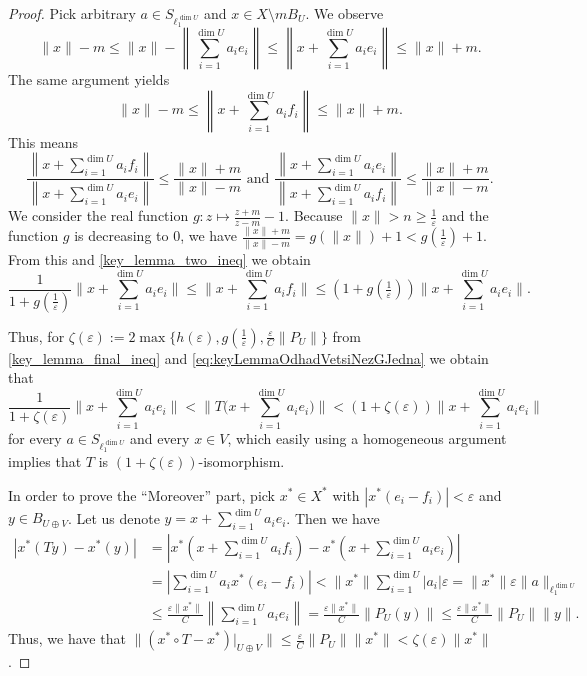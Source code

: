 \documentclass[11pt]{amsart}
\theoremstyle{definition}
\theoremstyle{remark}
\begin{document}
\begin{proof}
    Pick arbitrary $a \in S_{\ell_1^{\dim U}}$ and $x \in X \setminus mB_U$. We observe
	\[
	\|x\| - m \leq \| x \| - \left\| \sum_{i=1}^{\dim U} a_i e_i \right\| \leq \left\| x + \sum_{i=1}^{\dim U} a_i e_i \right\| \leq \|x\| + m.
	\]
	The same argument yields
	\[
	\|x\| -m \leq \left\| x + \sum_{i=1}^{\dim U} a_i f_i \right\| \leq \|x\| + m.
	\]
	This means
	\begin{equation} \label{key_lemma_two_ineq}
		\frac{\left\| x + \sum_{i=1}^{\dim U} a_i f_i \right\|}{\left\| x + \sum_{i=1}^{\dim U} a_i e_i \right\|} \leq \frac{\|x\| + m}{\|x\| - m} \text{ and } \frac{\left\| x + \sum_{i=1}^{\dim U} a_i e_i \right\|}{\left\| x + \sum_{i=1}^{\dim U} a_i f_i \right\|} \leq \frac{\|x\| + m}{\|x\| - m}.
	\end{equation}
	We consider the real function $g: z \mapsto \frac{z+m}{z-m} - 1$. Because $\| x \| > n\geq \tfrac{1}{\varepsilon}$ and the function $g$ is decreasing to $0$, we have $\frac{\|x\| + m}{\|x\| - m} = g(\|x\|) +1<g(\tfrac{1}{\varepsilon}) + 1$. From this and \eqref{key_lemma_two_ineq} we obtain	\begin{equation}\label{eq:keyLemmaOdhadVetsiNezGJedna}
	\frac{1}{1 + g(\tfrac{1}{\varepsilon})} \Big\| x + \sum_{i=1}^{\dim U} a_i e_i \Big\|\leq \Big\| x + \sum_{i=1}^{\dim U} a_i f_i \Big\| \leq (1 + g(\tfrac{1}{\varepsilon})) \Big\| x + \sum_{i=1}^{\dim U} a_i e_i \Big\|.
	\end{equation}

 Thus, for $\zeta(\varepsilon):=2\max\{h(\varepsilon),g(\tfrac{1}{\varepsilon}),\frac{\varepsilon}{C} \|P_U\|\}$ from \eqref{key_lemma_final_ineq} and \eqref{eq:keyLemmaOdhadVetsiNezGJedna} we obtain that 
 \[
    \frac{1}{1 + \zeta(\varepsilon)} \Big\| x + \sum_{i=1}^{\dim U} a_i e_i \Big\| < \Big\| T\Big(x + \sum_{i=1}^{\dim U} a_i e_i\Big) \Big\| < (1 + \zeta(\varepsilon)) \Big\| x + \sum_{i=1}^{\dim U} a_i e_i \Big\|
 \]
 for every $a\in S_{\ell_1^{\dim U}}$ and every $x\in V$, which easily using a homogeneous argument implies that $T$ is $(1+\zeta(\varepsilon))$-isomorphism.

 In order to prove the ``Moreover'' part, pick $x^*\in X^*$ with $|x^*(e_i-f_i)|<\varepsilon$ and $y\in B_{U\oplus V}$. Let us denote $y = x + \sum_{i=1}^{\dim U} a_i e_i$. Then we have
	\begin{align*}
		\left| x^*(Ty) - x^*(y) \right| &= \left| x^*\left(x + \sum_{i=1}^{\dim U} a_i f_i\right) - x^*\left(x + \sum_{i=1}^{\dim U} a_i e_i\right) \right| \\
		&= \left| \sum_{i=1}^{\dim U} a_i x^*(e_i - f_i) \right| < \|x^*\|\sum_{i=1}^{\dim U} |a_i| \varepsilon = \|x^*\|\varepsilon \|a\|_{\ell_1^{\dim U}} \\
		&\leq \frac{\varepsilon\|x^*\|}{C} \left\| \sum_{i=1}^{\dim U} a_i e_i \right\| = \frac{\varepsilon\|x^*\|}{C} \| P_U(y) \| \leq \frac{\varepsilon\|x^*\|}{C} \|P_U\| \|y\|.
	\end{align*}
	Thus, we have that $\|(x^*\circ T - x^*)|_{U\oplus V}\| \leq \frac{\varepsilon}{C} \|P_U\|\|x^*\| < \zeta(\varepsilon)\|x^*\|$.
\end{proof}
\end{document}
